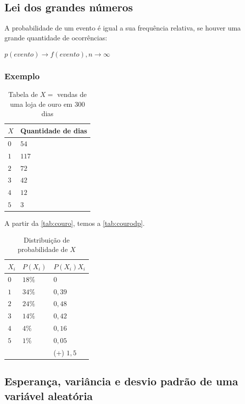 \documentclass[a4paper]{article}
\begin{document}
	\subsection{Lei dos grandes números}
	
	A probabilidade de um evento é igual a sua frequência relativa, se houver uma grande quantidade de ocorrências:
	
	$p(evento) \rightarrow f(evento), n \rightarrow \infty$
	
	\subsubsection{Exemplo}
	
	\begin{table}[h]
		\centering
		\caption{Tabela de $X =$ vendas de uma loja de  ouro em $300$ dias}
		\label{tab:couro}
		\begin{tabular}{l|l}
			\textbf{$X$} & \textbf{Quantidade de dias} \\ \hline
			$0$ & $54$ \\
			$1$ & $117$ \\
			$2$ & $72$ \\
			$3$ & $42$ \\
			$4$ & $12$ \\
			$5$ & $3$
		\end{tabular}
	\end{table}

	A partir da \autoref{tab:couro}, temos a \autoref{tab:courodp}.
	
	\begin{table}[]
		\centering
		\caption{Distribuição de probabilidade de $X$}
		\label{tab:courodp}
		\begin{tabular}{l|l|l}
			\textbf{$X_i$} & \textbf{$P(X_i)$} & \textbf{$P(X_i)X_i$} \\ \hline
			$0$ & $18\%$ & $0$ \\
			$1$ & $34\%$ & $0,39$ \\
			$2$ & $24\%$ & $0,48$ \\
			$3$ & $14\%$ & $0,42$ \\
			$4$ & $4\%$ & $0,16$ \\
			$5$ & $1\%$ & $0,05$ \\
			& & (+) $1,5$
		\end{tabular}
	\end{table}

	\subsection{Esperança, variância e desvio padrão de uma variável aleatória}
	
\end{document}
